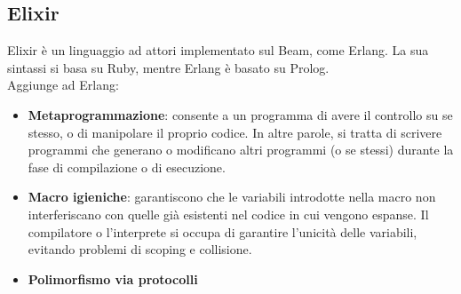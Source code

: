 \documentclass{article}
\begin{document}
\subsection*{Elixir}
Elixir è un linguaggio ad attori implementato sul Beam, come Erlang. La sua sintassi si basa su Ruby, mentre Erlang è basato su Prolog.\\
Aggiunge ad Erlang:
\begin{itemize}
    \item \textbf{Metaprogrammazione}: consente a un programma di avere il controllo su se stesso, o di manipolare il proprio codice. In altre parole, si tratta di scrivere programmi che generano o modificano altri programmi (o se stessi) durante la fase di compilazione o di esecuzione.
    \item \textbf{Macro igieniche}: garantiscono che le variabili introdotte nella macro non interferiscano con quelle già esistenti nel codice in cui vengono espanse. Il compilatore o l'interprete si occupa di garantire l'unicità delle variabili, evitando problemi di scoping e collisione.
    \item \textbf{Polimorfismo via protocolli}
\end{itemize}
\end{document}
